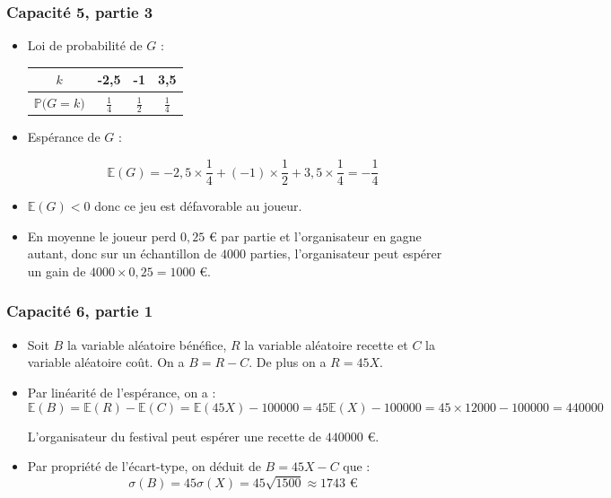 \documentclass[11pt, hyperref={urlcolor=red,%
            linkcolor=blue, %
            colorlinks=true}]{beamer}
\newcommand{\proba}[1]{\mathbb{P}\big(#1\big)}
\newcommand{\esperance}[1]{\mathbb{E}\left(#1\right)}
\newcommand{\ecart}[1]{\sigma\left(#1\right)}
\begin{document}
\begin{frame}

\frametitle{Capacité 5,  partie 3}

\begin{itemize}

	\pause \item  Loi de probabilité de $G$ :
	
\begin{tabular}{|c|c|c|c|}
\hline 
$k$ & -2,5 & -1 & 3,5 \\ 
\hline 
$\proba{G=k}$ & $\frac{1}{4}$ & $\frac{1}{2}$ & $\frac{1}{4}$ \\ 
\hline 
\end{tabular} 
	
	
		\pause \item  Espérance de $G$ :
		
$$\esperance{G}= -2,5 \times \frac{1}{4} + (-1) \times \frac{1}{2} + 3,5 \times \frac{1}{4}=-\frac{1}{4}  $$

  \pause \item $\esperance{G}<0$ donc ce jeu est défavorable au joueur.
  
  \pause \item En moyenne le joueur perd $0,25$ € par partie et l'organisateur en gagne autant, donc sur un échantillon de $4000$ parties, l'organisateur peut espérer un gain de $4000\times 0,25=1000$ €. 	
	\end{itemize}
\end{frame}



\begin{frame}
\label{capacite6}
\frametitle{Capacité 6,  partie 1}

\begin{itemize}
 \item   Soit $B$ la variable aléatoire bénéfice,  $R$ la variable aléatoire recette et $C$ la variable aléatoire coût.  On a $B=R-C$. De plus on a $R=45 X$.

\pause \item   Par linéarité de l'espérance, on a :
$$\esperance{B}=\esperance{R}-\esperance{C}=\esperance{45X}-100000=45\esperance{X}-100000=45 \times 12000-100000=440000$$

L'organisateur du festival peut espérer une recette de $440000$ €.
	
	\pause \item   Par propriété de l'écart-type, on déduit de   $B=45X-C$ que :
	$$\ecart{B}=45\ecart{X}=45 \sqrt{1500} \approx 1743 \text{ €}$$
	
	\end{itemize}
\end{frame}
\end{document}
